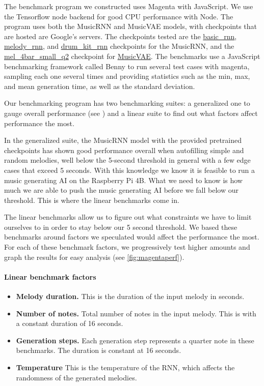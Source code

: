 The benchmark program we constructed uses Magenta with JavaScript. We use the Tensorflow
node backend for good CPU performance with Node. The program uses both the MusicRNN and
MusicVAE models, with checkpoints that are hosted are Google's servers. The checkpoints
tested are the \url{basic_rnn}, \url{melody_rnn}, and \url{drum_kit_rnn} checkpoints for
the MusicRNN, and the \url{mel_4bar_small_q2} checkpoint for \url{MusicVAE}. The benchmarks
use a JavaScript benchmarking framework called Benny to run several test cases with
magenta, sampling each one several times and providing statistics such as the min, max,
and mean generation time, as well as the standard deviation.

Our benchmarking program has two benchmarking suites: a generalized one to gauge overall
performance (see ) and a linear suite to find out what
factors affect performance the most.

In the generalized suite, the MusicRNN model with the provided pretrained checkpoints has
shown good performance overall when autofilling simple and random melodies, well below the
5-second threshold in general with a few edge cases that exceed 5 seconds. With this
knowledge we know it is feasible to run a music generating AI on the Raspberry Pi 4B. What
we need to know is how much we are able to push the music generating AI before we fall
below our threshold. This is where the linear benchmarks come in.

The linear benchmarks allow us to figure out what constraints we have to limit ourselves
to in order to stay below our 5 second threshold. We based these benchmarks around factors
we speculated would affect the performance the most. For each of these benchmark factors,
we progressively test higher amounts and graph the results for easy analysis (see
\autoref{fig:magentaperf}).

\paragraph{Linear benchmark factors}
\begin{itemize}
  \item \textbf{Melody duration.} This is the duration of the input melody in seconds.
  \item \textbf{Number of notes.} Total number of notes in the input melody. This is with
        a constant duration of 16 seconds.
  \item \textbf{Generation steps.} Each generation step represents a quarter note in these
        benchmarks. The duration is constant at 16 seconds.
  \item \textbf{Temperature} This is the temperature of the RNN, which affects the
        randomness of the generated melodies.
\end{itemize}

